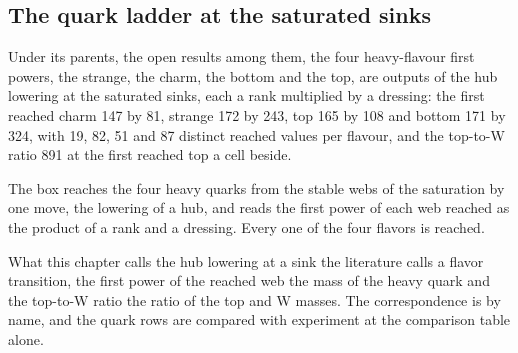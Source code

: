 \subsection{The quark ladder at the saturated sinks}\label{mod:VII-7-D536267-qlsk-t1}
\begin{chconditional}\label{box:VII-7-D536267-qlsk-t1:1}
Under its parents, the open results among them, the four heavy-flavour first powers, the strange, the charm, the bottom and the top, are outputs of the hub lowering at the saturated sinks, each a rank multiplied by a dressing: the first reached charm 147 by 81, strange 172 by 243, top 165 by 108 and bottom 171 by 324, with 19, 82, 51 and 87 distinct reached values per flavour, and the top-to-W ratio 891 at the first reached top a cell beside.
\end{chconditional}
The box reaches the four heavy quarks from the stable webs of the saturation by one move, the lowering of a hub, and reads the first power of each web reached as the product of a rank and a dressing. Every one of the four flavors is reached.
\begin{chbridge}
What this chapter calls the hub lowering at a sink the literature calls a flavor transition, the first power of the reached web the mass of the heavy quark and the top-to-W ratio the ratio of the top and W masses. The correspondence is by name, and the quark rows are compared with experiment at the comparison table alone.
\end{chbridge}
